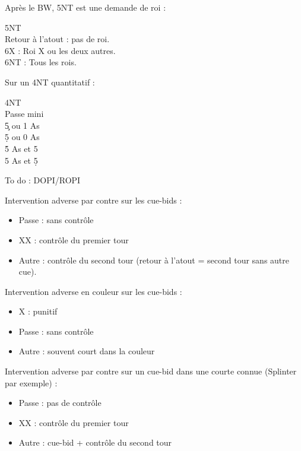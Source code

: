 \documentclass[a4paper]{article}
\begin{document}
Après le BW, 5NT est une demande de roi :

\begin{bidtable}
5NT\+\\
Retour \> à l'atout : pas de roi.\\
6X \> : Roi X ou les deux autres.\\
6NT \> : Tous les rois.\-
\end{bidtable}

Sur un 4NT quantitatif :

\begin{bidtable}
4NT\+\\
Passe \> mini\\
5\c {} ou 1 As\\
5\d {} ou 0 As\\
5\h {} As et 5\c \\
5\s {} As et 5\d \-
\end{bidtable}

To do : DOPI/ROPI

Intervention adverse par contre sur les cue-bids :

\begin{itemize}
\item Passe : sans contrôle

\item XX : contrôle du premier tour

\item Autre : contrôle du second tour (retour à l'atout = second tour sans autre cue).

\end{itemize}

Intervention adverse en couleur sur les cue-bids :

\begin{itemize}
\item X : punitif

\item Passe : sans contrôle

\item Autre : souvent court dans la couleur

\end{itemize}

Intervention adverse par contre sur un cue-bid dans une courte connue (Splinter par exemple) :

\begin{itemize}
\item Passe : pas de contrôle

\item XX : contrôle du premier tour

\item Autre : cue-bid + contrôle du second tour

\end{itemize}
\end{document}
